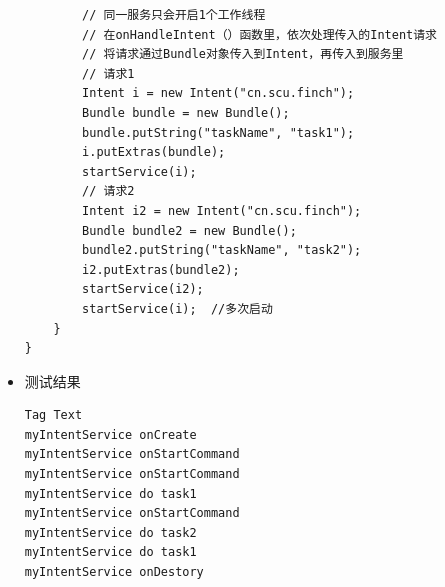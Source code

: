 \documentclass[9pt, b5paper]{article}
\begin{document}
\begin{itemize}
\begin{verbatim}
        // 同一服务只会开启1个工作线程
        // 在onHandleIntent（）函数里，依次处理传入的Intent请求
        // 将请求通过Bundle对象传入到Intent，再传入到服务里
        // 请求1
        Intent i = new Intent("cn.scu.finch");
        Bundle bundle = new Bundle();
        bundle.putString("taskName", "task1");
        i.putExtras(bundle);
        startService(i);
        // 请求2
        Intent i2 = new Intent("cn.scu.finch");
        Bundle bundle2 = new Bundle();
        bundle2.putString("taskName", "task2");
        i2.putExtras(bundle2);
        startService(i2);
        startService(i);  //多次启动
    }
}
\end{verbatim}
\item 测试结果
\begin{verbatim}
Tag Text
myIntentService onCreate
myIntentService onStartCommand
myIntentService onStartCommand
myIntentService do task1
myIntentService onStartCommand
myIntentService do task2
myIntentService do task1
myIntentService onDestory
\end{verbatim}
\end{itemize}
\end{document}
